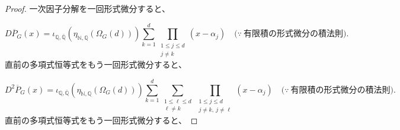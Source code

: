 \documentclass[11pt,a4paper]{article}
\theoremstyle{remark}
\begin{document}
\begin{proof}
一次因子分解を一回形式微分すると、

\[D\overline P_G(x)
=
\iota_{\mathbb Q,\overline{\mathbb Q}}\!\left(
  \eta_{\mathbb N,\mathbb Q}\!\left(\Omega_G(d)\right)
\right)
\sum_{k=1}^{d}
\prod_{\substack{1\le j\le d\\j\ne k}}(x-\alpha_j)
\quad\bigl(\because\ \text{有限積の形式微分の積法則}\bigr).\]
直前の多項式恒等式をもう一回形式微分すると、

\[D^2\overline P_G(x)
=
\iota_{\mathbb Q,\overline{\mathbb Q}}\!\left(
  \eta_{\mathbb N,\mathbb Q}\!\left(\Omega_G(d)\right)
\right)
\sum_{k=1}^{d}
\sum_{\substack{1\le\ell\le d\\\ell\ne k}}
\prod_{\substack{1\le j\le d\\j\ne k,\ j\ne\ell}}(x-\alpha_j)
\quad\bigl(\because\ \text{有限積の形式微分の積法則}\bigr).\]
直前の多項式恒等式をもう一回形式微分すると、


\end{proof}
\end{document}
